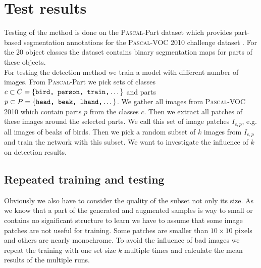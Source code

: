 %
\chapter{Test results}
\label{sec:results}
Testing of the method is done on the \textsc{Pascal}-Part dataset \citep{Chen_2014_CVPR} which provides part-based segmentation annotations for the \textsc{Pascal}-VOC 2010 challenge dataset \citep{pascal-voc-2010}. For the 20 object classes the dataset contains binary segmentation maps for parts of these objects.\\
For testing the detection method we train a model with different number of images. From \textsc{Pascal}-Part we pick sets of classes $c \subset C = \{\texttt{bird, person, train,}\dotsc\}$ and parts $p \subset P = \{\texttt{head, beak, lhand,}\dotsc\}$. We gather all images from \textsc{Pascal}-VOC 2010 which contain parts $p$ from the classes $c$. Then we extract all patches of these images around the selected parts. We call this set of image patches $I_{c,p}$, e.g. all images of beaks of birds. Then we pick a random subset of $k$ images from $I_{c,p}$ and train the network with this subset. We want to investigate the influence of $k$ on detection results.\\

\section{Repeated training and testing}
\label{sec:results:repeat}
Obviously we also have to consider the quality of the subset not only its size. As we know that a part of the generated and augmented samples is way to small or contains no significant structure to learn we have to assume that some image patches are not useful for training. Some patches are smaller than $10\times10$ pixels and others are nearly monochrome. To avoid the influence of bad images we repeat the training with one set size $k$ multiple times and calculate the mean results of the multiple runs.

